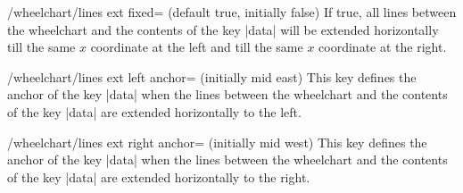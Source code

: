 \documentclass[a4paper,english,dvipsnames]{ltxdoc}
\begin{document}
\begin{key}{/wheelchart/lines ext fixed= (default true, initially false)}
If true, all lines between the wheelchart and the contents of the key |data| will be extended horizontally till the same $x$ coordinate at the left and till the same $x$ coordinate at the right.
\end{key}
\begin{key}{/wheelchart/lines ext left anchor= (initially mid east)}
This key defines the anchor of the key |data| when the lines between the wheelchart and the contents of the key |data| are extended horizontally to the left.
\end{key}
\begin{key}{/wheelchart/lines ext right anchor= (initially mid west)}
This key defines the anchor of the key |data| when the lines between the wheelchart and the contents of the key |data| are extended horizontally to the right.
\end{key}
\end{document}
